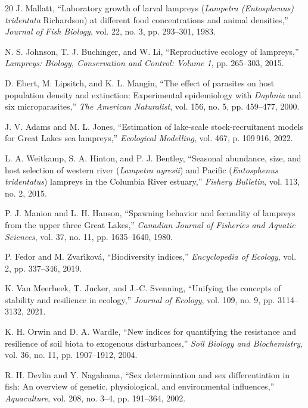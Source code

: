 \documentclass[11pt,a4paper]{ctexart}
\begin{document}
\begin{thebibliography}{20}
 J. Mallatt, ``Laboratory growth of larval lampreys (\emph{Lampetra (Entosphenus) tridentata} Richardson) at different food concentrations and animal densities,'' \emph{Journal of Fish Biology}, vol. 22, no. 3, pp. 293--301, 1983.

 N. S. Johnson, T. J. Buchinger, and W. Li, ``Reproductive ecology of lampreys,'' \emph{Lampreys: Biology, Conservation and Control: Volume 1}, pp. 265--303, 2015.

 D. Ebert, M. Lipsitch, and K. L. Mangin, ``The effect of parasites on host population density and extinction: Experimental epidemiology with \emph{Daphnia} and six microparasites,'' \emph{The American Naturalist}, vol. 156, no. 5, pp. 459--477, 2000.

 J. V. Adams and M. L. Jones, ``Estimation of lake-scale stock-recruitment models for Great Lakes sea lampreys,'' \emph{Ecological Modelling}, vol. 467, p. 109\,916, 2022.

 L. A. Weitkamp, S. A. Hinton, and P. J. Bentley, ``Seasonal abundance, size, and host selection of western river (\emph{Lampetra ayresii}) and Pacific (\emph{Entosphenus tridentatus}) lampreys in the Columbia River estuary,'' \emph{Fishery Bulletin}, vol. 113, no. 2, 2015.

 P. J. Manion and L. H. Hanson, ``Spawning behavior and fecundity of lampreys from the upper three Great Lakes,'' \emph{Canadian Journal of Fisheries and Aquatic Sciences}, vol. 37, no. 11, pp. 1635--1640, 1980.

 P. Fedor and M. Zvar\'{\i}kov\'{a}, ``Biodiversity indices,'' \emph{Encyclopedia of Ecology}, vol. 2, pp. 337--346, 2019.

 K. Van Meerbeek, T. Jucker, and J.-C. Svenning, ``Unifying the concepts of stability and resilience in ecology,'' \emph{Journal of Ecology}, vol. 109, no. 9, pp. 3114--3132, 2021.

 K. H. Orwin and D. A. Wardle, ``New indices for quantifying the resistance and resilience of soil biota to exogenous disturbances,'' \emph{Soil Biology and Biochemistry}, vol. 36, no. 11, pp. 1907--1912, 2004.

 R. H. Devlin and Y. Nagahama, ``Sex determination and sex differentiation in fish: An overview of genetic, physiological, and environmental influences,'' \emph{Aquaculture}, vol. 208, no. 3--4, pp. 191--364, 2002.

\end{thebibliography}
\end{document}
